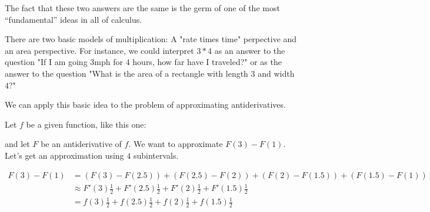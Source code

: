 \documentclass{ximera}
\begin{document}
The fact that these two answers are the same is the germ of one of the
most ``fundamental'' ideas in all of calculus.

\begin{idea}
  There are two basic models of multiplication: A "rate times time"
  perpective and an area perspective.  For instance, we could
  interpret $3*4$ as an answer to the question "If I am going $3
  \textrm{mph}$ for $4$ hours, how far have I traveled?" or as the
  answer to the question "What is the area of a rectangle with length
  $3$ and width $4$?"
\end{idea}

We can apply this basic idea to the problem of approximating
antiderivatives.

  Let $f$ be a given function, like this one:

\begin{image}
\end{image}

 and let $F$ be an antiderivative of $f$.  We want to approximate $F(3) - F(1)$.  Let's get an approximation using $4$ subintervals.
  
  \begin{align*}F(3) - F(1) &= (F(3) - F(2.5))+(F(2.5) - F(2))+(F(2) - F(1.5))+(F(1.5) - F(1))\\
  &\approx F'(3)\frac{1}{2}+F'(2.5)\frac{1}{2}+F'(2)\frac{1}{2}+F'(1.5)\frac{1}{2}\\
  &=f(3)\frac{1}{2}+f(2.5)\frac{1}{2}+f(2)\frac{1}{2}+f(1.5)\frac{1}{2}
  \end{align*}
  
\end{document}
